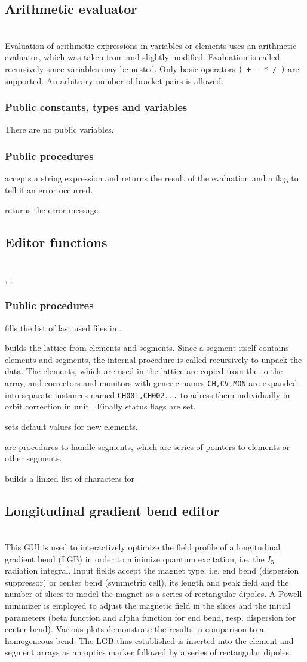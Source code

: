 \documentclass[12pt]{article}
\newcommand\code[1]{{\tt #1}}
\newcommand{\unico}[1]{{\color{burntorange}\code{#1}}}
\newcommand{\opagui}[1]{\colorbox{blue!20}{{\color{black}\code{#1}}}}
\newcommand{\oguih}[2]{\subsection{\label{#2}#1}{\Huge\opagui{#2}}\\}
\newcommand{\ogui}[1]{\hyperref[#1]{\opagui{#1}}}
\newcommand{\opauni}[1]{\colorbox{orange!30}{{\color{black}\code{#1}}}}
\newcommand{\ounih}[2]{\subsection{\label{#2}#1}{\Huge\opauni{#2}}\\}
\newcommand{\ouni}[1]{\hyperref[#1]{\opauni{#1}}}
\newcommand{\uses}[1]{\flushleft {\bf Uses:} #1}
\newcommand{\desc}[1]{#1}
\newcommand{\pvar}[1]{\subsubsection*{Public constants, types and variables} #1}
\newcommand{\ppro}[1]{\subsubsection*{Public procedures} #1}
\begin{document}
\ounih{Arithmetic evaluator}{varlib} 

\desc{
Evaluation of arithmetic expressions in variables or elements uses an arithmetic evaluator, which was taken from \cite{rosetta} and slightly modified. Evaluation is called recursively since variables may be nested. Only basic operators \code{( + - * / )} are supported. An arbitrary number of bracket pairs is allowed.
}

\uses{\ouni{globlib}}

\pvar{There are no public variables.}

\ppro{
\unico{Eval\_Exp} accepts a string expression and returns the result of the evaluation and a flag to tell if an error occurred.

\unico{Get\_Eval\_exp\_errmess} returns the error message.
}



\ounih{Editor functions}{editorlib} 
\desc{
}
\uses{\ouni{globlib}, \ouni{mathlib}, \ouni{comauxlib}}

\ppro{}

\unico{FillComboSeg} fills the list of last used files in \ogui{opamenu}.

\unico{MakeLattice} builds the lattice from elements and segments. Since a segment itself contains elements and segments, the internal procedure \unico{SegLat} is called recursively to unpack the data. 
The elements, which are used in the lattice are copied from the \unico{Elem} to the \unico{Ella} array, and correctors and monitors with generic names \code{CH,CV,MON}
are expanded into separate instances named \code{CH001,CH002...} to adress them individually in orbit correction in unit \ogui{opaorbit}. Finally status flags are set.


\unico{IniElem} sets default values for new elements.

\unico{AppendAE, ClearSeg, NAESeg} are procedures to handle segments, which are series of pointers to elements or other segments.

\unico{AppendChar} builds a linked list of characters for \ogui{opatexteditor} 


\oguih{Longitudinal gradient bend editor}{opalgbedit} 

\desc{This GUI is used to interactively optimize the field profile of a longitudinal gradient bend (LGB) in order to minimize quantum excitation, i.e. the $I_5$ radiation integral. Input fields accept the magnet type, i.e. end bend (dispersion suppressor) or center bend (symmetric cell), its length and peak field and the number of slices to model the magnet as a series of rectangular dipoles. A Powell minimizer is employed to adjust the magnetic field in the slices and the initial parameters (beta function and alpha function for end bend, resp. dispersion for center bend). Various plots demonstrate the results in comparison to a homogeneous bend. The LGB thus established is inserted into the element and segment arrays as an optics marker followed by a series of rectangular dipoles.}
\end{document}
